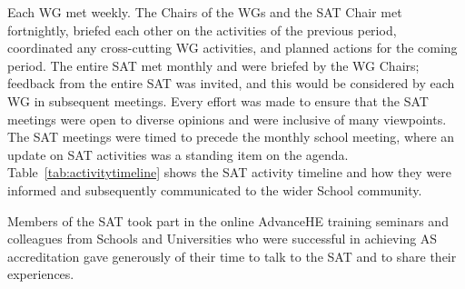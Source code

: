 Each WG met weekly. The Chairs of the WGs and the SAT Chair met fortnightly, briefed each other on the activities of the previous period, coordinated any cross-cutting WG activities, and planned actions for the coming period. 
The entire SAT met monthly and were briefed by the WG Chairs; feedback from the entire SAT was invited, and this would be considered by each WG in subsequent meetings. Every effort was made to ensure that the SAT meetings were open to diverse opinions and were inclusive of many viewpoints. 
The SAT meetings were timed to precede the monthly school meeting, where an update on SAT activities was a standing item on the agenda.
Table~\ref{tab:activitytimeline} shows the SAT activity timeline and how they were informed and subsequently communicated to the wider School community.

Members of the SAT took part in the online AdvanceHE training seminars and colleagues from Schools and Universities who were successful in achieving AS accreditation gave generously of their time to talk to the SAT and to share their experiences. 



